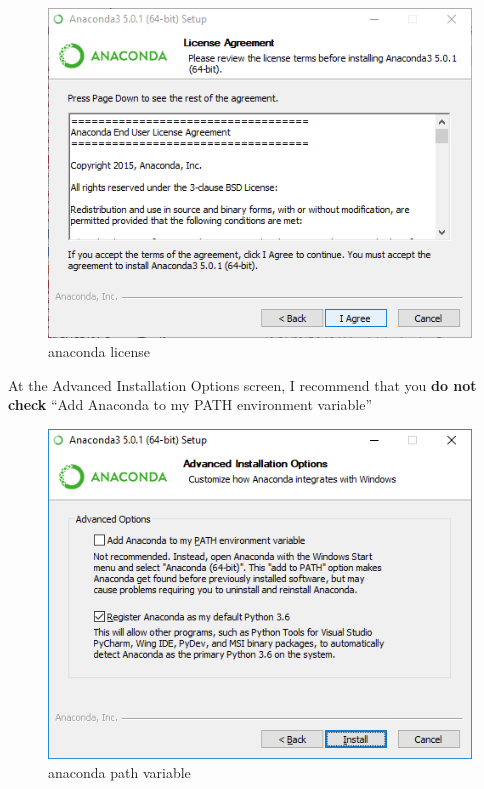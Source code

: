 \documentclass{book}
\makeatletter
\def\maxwidth{\ifdim\Gin@nat@width>\linewidth\linewidth
    \else\Gin@nat@width\fi}
\let\Oldincludegraphics\includegraphics
\renewcommand{\includegraphics}[1]{\Oldincludegraphics[width=.8\maxwidth]{#1}}
\makeatother
\begin{document}
\begin{figure}
\centering
\includegraphics{images/anaconda_agree_to_license.png}
\caption{anaconda license}
\end{figure}

At the Advanced Installation Options screen, I recommend that you
\textbf{do not check} ``Add Anaconda to my PATH environment variable''

\begin{figure}
\centering
\includegraphics{images/anaconda_path2.png}
\caption{anaconda path variable}
\end{figure}
    
\end{document}
